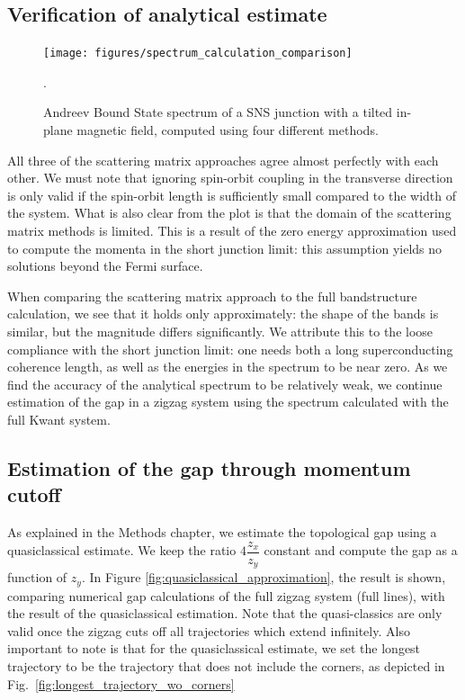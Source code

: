 		\subsection{Verification of analytical estimate}
			\begin{figure}[!htb]
			\centering
			\texttt{[image: figures/spectrum\_calculation\_comparison]}
			\caption{Andreev Bound State spectrum of a SNS junction with a tilted in-plane magnetic field, computed using four different methods.}.
			\label{fig:spectrum_calculation_comparison}
			\end{figure}
		
			All three of the scattering matrix approaches agree almost perfectly with each other.
			We must note that ignoring spin-orbit coupling in the transverse direction is only valid if the spin-orbit length is sufficiently small compared to the width of the system.
			What is also clear from the plot is that the domain of the scattering matrix methods is limited.
			This is a result of the zero energy approximation used to compute the momenta in the short junction limit: this assumption yields no solutions beyond the Fermi surface.

			When comparing the scattering matrix approach to the full bandstructure calculation, we see that it holds only approximately: the shape of the bands is similar, but the magnitude differs significantly.
			We attribute this to the loose compliance with the short junction limit: one needs both a long superconducting coherence length, as well as the energies in the spectrum to be near zero.
			As we find the accuracy of the analytical spectrum to be relatively weak, we continue estimation of the gap in a zigzag system using the spectrum calculated with the full Kwant system.

		\subsection{Estimation of the gap through momentum cutoff}
			As explained in the Methods chapter, we estimate the topological gap using a quasiclassical estimate.
			We keep the ratio $4\dfrac{z_x}{z_y}$ constant and compute the gap as a function of $z_y$.
			In Figure \ref{fig:quasiclassical_approximation}, the result is shown, comparing numerical gap calculations of the full zigzag system (full lines), with the result of the quasiclassical estimation.
			Note that the quasi-classics are only valid once the zigzag cuts off all trajectories which extend infinitely.
			Also important to note is that for the quasiclassical estimate, we set the longest trajectory to be the trajectory that does not include the corners, as depicted in Fig.~\ref{fig:longest_trajectory_wo_corners}

